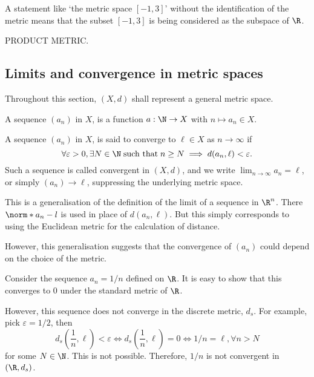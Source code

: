 \begin{remark}
  A statement like `the metric space $[-1,3]$' without the identification of the metric means that the subset $[-1,3]$ is being considered as the subspace of $\R$.
\end{remark}

PRODUCT METRIC.

\subsection{Limits and convergence in metric spaces}
Throughout this section, $(X,d)$ shall represent a general metric space.

\begin{ndfn}
  A sequence $(a_n)$ in $X$, is a function $a:\N \to X$ with $n \mapsto a_n \in X$.
\end{ndfn}

\begin{ndfn}
  A sequence $(a_n)$ in $X$, is said to converge to $\ell \in X$ as $n \to \infty$ if
  \begin{equation*}
    \forall \varepsilon > 0, \exists N \in \N\;\text{such that}\;n \geq N \implies d(a_n, \ell) < \varepsilon.
  \end{equation*}
  Such a sequence is called convergent in $(X,d)$, and we write $\lim_{n\to\infty} a_n = \ell$, or simply $(a_n) \to \ell$, suppressing the underlying metric space.
\end{ndfn}

This is a generalisation of the definition of the limit of a sequence in $\R^n$. There $\norm*{a_n - l}$ is used in place of $d(a_n, \ell)$. But this simply corresponds to using the Euclidean metric for the calculation of distance.

However, this generalisation suggests that the convergence of $(a_n)$ could depend on the choice of the metric.
\begin{negg}
  Consider the sequence $a_n = 1/n$ defined on $\R$. It is easy to show that this converges to $0$ under the standard metric of $\R$.

  However, this sequence does not converge in the discrete metric, $d_s$. For example, pick $\varepsilon = 1/2$, then
  \begin{equation*}
    d_s\left(\frac{1}{n},\ell\right) < \varepsilon \iff d_s\left(\frac{1}{n},\ell\right) = 0 \iff 1/n = \ell, \forall n>N
  \end{equation*}
  for some $N \in \N$. This is not possible. Therefore, $1/n$ is not convergent in $(\R, d_s)$.
\end{negg}

